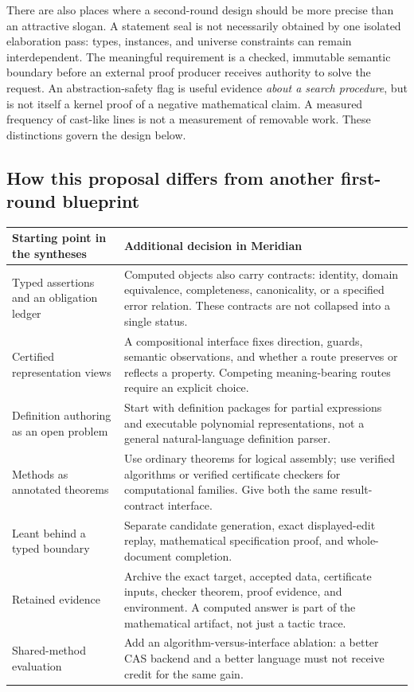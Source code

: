 \documentclass[11pt,a4paper]{article}
\theoremstyle{remark}
\begin{document}
There are also places where a second-round design should be more precise than
an attractive slogan. A statement seal is not necessarily obtained by one
isolated elaboration pass: types, instances, and universe constraints can remain
interdependent. The meaningful requirement is a checked, immutable semantic
boundary before an external proof producer receives authority to solve the
request. An abstraction-safety flag is useful evidence \emph{about a search
procedure}, but is not itself a kernel proof of a negative mathematical claim.
A measured frequency of cast-like lines is not a measurement of removable work.
These distinctions govern the design below.

\subsection{How this proposal differs from another first-round blueprint}
\begin{longtable}{@{}L{.28\textwidth}L{.64\textwidth}@{}}
\toprule
Starting point in the syntheses & Additional decision in Meridian \\
\midrule
\endhead
Typed assertions and an obligation ledger & Computed objects also carry contracts:
identity, domain equivalence, completeness, canonicality, or a specified error
relation. These contracts are not collapsed into a single status.\\
Certified representation views & A compositional interface fixes direction,
guards, semantic observations, and whether a route preserves or reflects a
property. Competing meaning-bearing routes require an explicit choice.\\
Definition authoring as an open problem & Start with definition packages for
partial expressions and executable polynomial representations, not a general
natural-language definition parser.\\
Methods as annotated theorems & Use ordinary theorems for logical assembly;
use verified algorithms or verified certificate checkers for computational
families. Give both the same result-contract interface.\\
Leant behind a typed boundary & Separate candidate generation, exact displayed-edit
replay, mathematical specification proof, and whole-document completion.\\
Retained evidence & Archive the exact target, accepted data, certificate inputs,
checker theorem, proof evidence, and environment. A computed answer is part of
the mathematical artifact, not just a tactic trace.\\
Shared-method evaluation & Add an algorithm-versus-interface ablation: a better CAS
backend and a better language must not receive credit for the same gain.\\
\bottomrule
\end{longtable}
\end{document}
